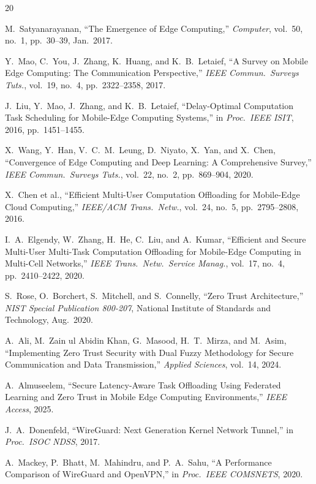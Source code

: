 \documentclass[10pt,twocolumn]{article}
\begin{document}
\begin{thebibliography}{20}

M.~Satyanarayanan,
``The Emergence of Edge Computing,''
\textit{Computer}, vol.~50, no.~1, pp.~30--39, Jan.\ 2017.

Y.~Mao, C.~You, J.~Zhang, K.~Huang, and K.~B.\ Letaief,
``A Survey on Mobile Edge Computing: The Communication Perspective,''
\textit{IEEE Commun.\ Surveys Tuts.}, vol.~19, no.~4, pp.~2322--2358,
2017.

J.~Liu, Y.~Mao, J.~Zhang, and K.~B.\ Letaief,
``Delay-Optimal Computation Task Scheduling for Mobile-Edge Computing Systems,''
in \textit{Proc.\ IEEE ISIT}, 2016, pp.~1451--1455.

X.~Wang, Y.~Han, V.~C.~M.\ Leung, D.~Niyato, X.~Yan, and X.~Chen,
``Convergence of Edge Computing and Deep Learning: A Comprehensive Survey,''
\textit{IEEE Commun.\ Surveys Tuts.}, vol.~22, no.~2, pp.~869--904, 2020.

X.~Chen et al.,
``Efficient Multi-User Computation Offloading for Mobile-Edge Cloud
Computing,''
\textit{IEEE/ACM Trans.\ Netw.}, vol.~24, no.~5, pp.~2795--2808, 2016.

I.~A.~Elgendy, W.~Zhang, H.~He, C.~Liu, and A.~Kumar,
``Efficient and Secure Multi-User Multi-Task Computation Offloading
for Mobile-Edge Computing in Multi-Cell Networks,''
\textit{IEEE Trans.\ Netw.\ Service Manag.}, vol.~17, no.~4,
pp.~2410--2422, 2020.

S.~Rose, O.~Borchert, S.~Mitchell, and S.~Connelly,
``Zero Trust Architecture,''
\textit{NIST Special Publication 800-207}, National Institute of Standards
and Technology, Aug.\ 2020.

A.~Ali, M.~Zain ul Abidin Khan, G.~Masood, H.~T.~Mirza, and M.~Asim,
``Implementing Zero Trust Security with Dual Fuzzy Methodology
for Secure Communication and Data Transmission,''
\textit{Applied Sciences}, vol.~14, 2024.

A.~Almuseelem,
``Secure Latency-Aware Task Offloading Using Federated Learning and
Zero Trust in Mobile Edge Computing Environments,''
\textit{IEEE Access}, 2025.

J.~A.~Donenfeld,
``WireGuard: Next Generation Kernel Network Tunnel,''
in \textit{Proc.\ ISOC NDSS}, 2017.

A.~Mackey, P.~Bhatt, M.~Mahindru, and P.~A.~Sahu,
``A Performance Comparison of WireGuard and OpenVPN,''
in \textit{Proc.\ IEEE COMSNETS}, 2020.


\end{thebibliography}
\end{document}
